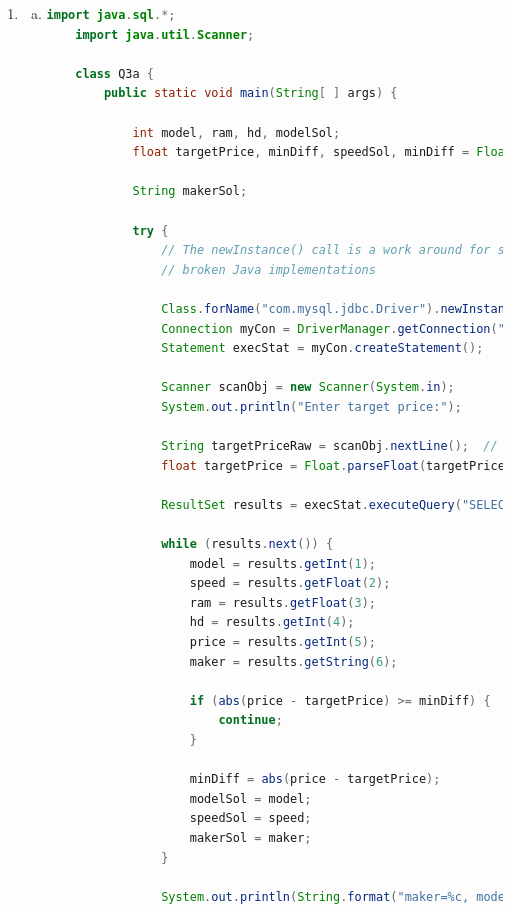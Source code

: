 \documentclass[12pt]{article}
\begin{document}
\begin{enumerate}[1.]
\begin{enumerate}[a)]
    \end{enumerate}

    \item

    \begin{enumerate}[a)]
        \item

        \bigskip
    \begin{lstlisting}[language=java]
    import java.sql.*;
    import java.util.Scanner;

    class Q3a {
        public static void main(String[ ] args) {

            int model, ram, hd, modelSol;
            float targetPrice, minDiff, speedSol, minDiff = Float.MAX_VALUE;

            String makerSol;

            try {
                // The newInstance() call is a work around for some
                // broken Java implementations

                Class.forName("com.mysql.jdbc.Driver").newInstance();
                Connection myCon = DriverManager.getConnection("jdbc:mysql://localhost/Q3");
                Statement execStat = myCon.createStatement();

                Scanner scanObj = new Scanner(System.in);
                System.out.println("Enter target price:");

                String targetPriceRaw = scanObj.nextLine();  // Read user input
                float targetPrice = Float.parseFloat(targetPriceRaw);

                ResultSet results = execStat.executeQuery("SELECT model, speed, ram, hd, price, maker FROM Product NATURAL JOIN PC");

                while (results.next()) {
                    model = results.getInt(1);
                    speed = results.getFloat(2);
                    ram = results.getFloat(3);
                    hd = results.getInt(4);
                    price = results.getInt(5);
                    maker = results.getString(6);

                    if (abs(price - targetPrice) >= minDiff) {
                        continue;
                    }

                    minDiff = abs(price - targetPrice);
                    modelSol = model;
                    speedSol = speed;
                    makerSol = maker;
                }

                System.out.println(String.format("maker=%c, model=%d, speed=%.2f\n", makerSol, modelSol, speedSol));


\end{lstlisting}
\end{enumerate}
\end{enumerate}
\end{document}
